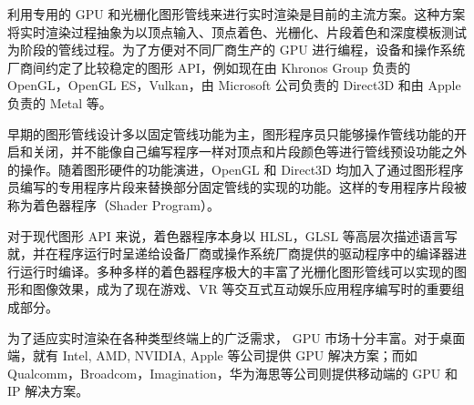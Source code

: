 利用专用的 GPU 和光栅化图形管线来进行实时渲染是目前的主流方案。这种方案将实时渲染过程抽象为以顶点输入、顶点着色、光栅化、片段着色和深度模板测试为阶段的管线过程。为了方便对不同厂商生产的 GPU 进行编程，设备和操作系统厂商间约定了比较稳定的图形 API，例如现在由 Khronos Group 负责的 OpenGL\cite{OpenGLSpec}，OpenGL ES\cite{OpenGLESSpec}，Vulkan\cite{VulkanSpec}，由 Microsoft 公司负责的 Direct3D\cite{Direct3DSpec} 和由 Apple 负责的 Metal\cite{MetalSpec} 等。


早期的图形管线设计多以固定管线功能为主，图形程序员只能够操作管线功能的开启和关闭，并不能像自己编写程序一样对顶点和片段颜色等进行管线预设功能之外的操作。随着图形硬件的功能演进，OpenGL 和 Direct3D 均加入了通过图形程序员编写的专用程序片段来替换部分固定管线的实现的功能。这样的专用程序片段被称为着色器程序（Shader Program）。

对于现代图形 API 来说，着色器程序本身以 HLSL，GLSL 等高层次描述语言写就，并在程序运行时呈递给设备厂商或操作系统厂商提供的驱动程序中的编译器进行运行时编译。多种多样的着色器程序极大的丰富了光栅化图形管线可以实现的图形和图像效果，成为了现在游戏、VR 等交互式互动娱乐应用程序编写时的重要组成部分。

为了适应实时渲染在各种类型终端上的广泛需求， GPU 市场十分丰富。对于桌面端，就有 Intel, AMD, NVIDIA, Apple 等公司提供 GPU 解决方案；而如 Qualcomm，Broadcom，Imagination，华为海思等公司则提供移动端的 GPU 和 IP 解决方案。

